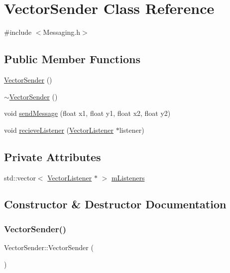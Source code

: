 \hypertarget{class_vector_sender}{}\section{Vector\+Sender Class Reference}
\label{class_vector_sender}


{\ttfamily \#include $<$Messaging.\+h$>$}

\subsection*{Public Member Functions}
\begin{DoxyCompactItemize}
\item 
\hyperlink{class_vector_sender_a45bfae605961331afdfe6586ffb018d2}{Vector\+Sender} ()
\item 
\hyperlink{class_vector_sender_accae2c766ad94d1ba98ef522c027594c}{$\sim$\+Vector\+Sender} ()
\item 
void \hyperlink{class_vector_sender_a5a4f8b41c85f1e0637b647e4afd36eea}{send\+Message} (float x1, float y1, float x2, float y2)
\item 
void \hyperlink{class_vector_sender_a3e198ee2de79b7ed6d5271630113a80c}{recieve\+Listener} (\hyperlink{class_vector_listener}{Vector\+Listener} $\ast$listener)
\end{DoxyCompactItemize}
\subsection*{Private Attributes}
\begin{DoxyCompactItemize}
\item 
std\+::vector$<$ \hyperlink{class_vector_listener}{Vector\+Listener} $\ast$ $>$ \hyperlink{class_vector_sender_ad92db3530a2c293d115455fd8b6a18ad}{m\+Listeners}
\end{DoxyCompactItemize}


\subsection{Constructor \& Destructor Documentation}
\mbox{\label{class_vector_sender_a45bfae605961331afdfe6586ffb018d2}} 
\subsubsection{\texorpdfstring{Vector\+Sender()}{VectorSender()}}
{\footnotesize\ttfamily Vector\+Sender\+::\+Vector\+Sender (\begin{DoxyParamCaption}{ }\end{DoxyParamCaption})}

